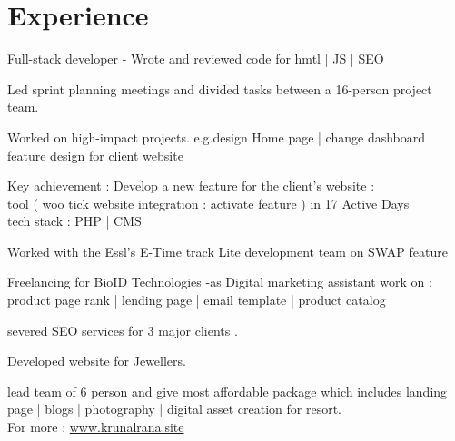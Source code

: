 \documentclass[]{deedy-resume-openfont}
\begin{document}
\begin{minipage}[t]{0.66\textwidth} 


\section{Experience}

\vspace{\topsep} %
\begin{tightemize}
\item Full-stack developer - Wrote and reviewed code for hmtl | JS | SEO 
\item Led sprint planning meetings and divided tasks between a 16-person project team.
\item Worked on high-impact projects. e.g.design Home page | change dashboard feature design for client website 
\item Key achievement : Develop a new feature for the client's website : \\  tool ( woo tick website integration : activate feature ) in 17 Active Days 
\\ tech stack : PHP | CMS
\end{tightemize}
\sectionsep

\begin{tightemize}
\item Worked with the Essl's E-Time track Lite development team on SWAP feature 
\item Freelancing for BioID Technologies -as Digital marketing assistant work on : product page rank | lending page | email template | product catalog   
    

\end{tightemize}
\sectionsep

\begin{tightemize}
\item severed SEO services for 3 major clients .
\item Developed website for Jewellers.
\item lead team of 6 person and give most affordable package which includes landing page | blogs | photography | digital asset creation  for resort. \\
For more : \href{https://www.krunalrana.site/}{www.krunalrana.site} 
\end{tightemize}


\end{minipage}
\end{document}
